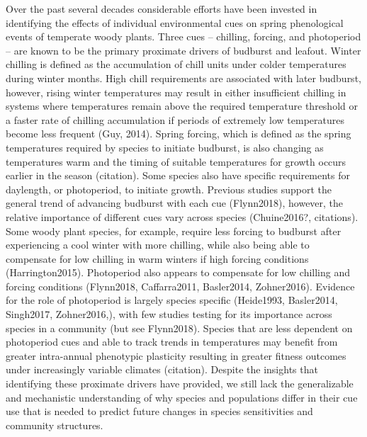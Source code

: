 \documentclass{article}\usepackage[]{graphicx}\usepackage[]{color}
\begin{document}
Over the past several decades considerable efforts have been invested in identifying the effects of individual environmental cues on spring phenological events of temperate woody plants. Three cues -- chilling, forcing, and photoperiod -- are known to be the primary proximate drivers of budburst and leafout. Winter chilling is defined as the accumulation of chill units under colder temperatures during winter months. High chill requirements are associated with later budburst, however, rising winter temperatures may result in either insufficient chilling in systems where temperatures remain above the required temperature threshold or a faster rate of chilling accumulation if periods of extremely low temperatures become less frequent (Guy, 2014). Spring forcing, which is defined as the spring temperatures required by species to initiate budburst, is also changing as temperatures warm and the timing of suitable temperatures for growth occurs earlier in the season (citation). Some species also have specific requirements for daylength, or photoperiod, to initiate growth. Previous studies support the general trend of advancing budburst with each cue (Flynn2018), however, the relative importance of different cues vary across species (Chuine2016?, citations). Some woody plant species, for example, require less forcing to budburst after experiencing a cool winter with more chilling, while also being able to compensate for low chilling in warm winters if high forcing conditions (Harrington2015). Photoperiod also appears to compensate for low chilling and forcing conditions (Flynn2018,  Caffarra2011, Basler2014,  Zohner2016). Evidence for the role of photoperiod is largely species specific (Heide1993, Basler2014, Singh2017, Zohner2016,), with few studies testing for its importance across species in a community (but see Flynn2018). Species that are less dependent on photoperiod cues and able to track trends in temperatures may benefit from greater intra-annual phenotypic plasticity resulting in greater fitness outcomes under increasingly variable climates (citation). Despite the insights that identifying these proximate drivers have provided, we still lack the generalizable and mechanistic understanding of why species and populations differ in their cue use that is needed to predict future changes in species sensitivities and community structures.
\end{document}
